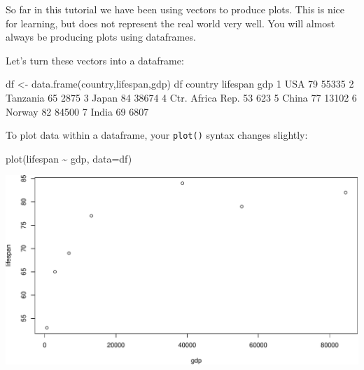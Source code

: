 \documentclass[
]{book}
\newenvironment{Shaded}{\begin{snugshade}}{\end{snugshade}}
\newcommand{\AttributeTok}[1]{\textcolor[rgb]{0.77,0.63,0.00}{#1}}
\newcommand{\DecValTok}[1]{\textcolor[rgb]{0.00,0.00,0.81}{#1}}
\newcommand{\FunctionTok}[1]{\textcolor[rgb]{0.00,0.00,0.00}{#1}}
\newcommand{\NormalTok}[1]{#1}
\newcommand{\OtherTok}[1]{\textcolor[rgb]{0.56,0.35,0.01}{#1}}
\newcommand{\SpecialCharTok}[1]{\textcolor[rgb]{0.00,0.00,0.00}{#1}}
\begin{document}
So far in this tutorial we have been using vectors to produce plots. This is nice for learning, but does not represent the real world very well. You will almost always be producing plots using dataframes.

Let's turn these vectors into a dataframe:

\begin{Shaded}
\begin{Highlighting}[]
\NormalTok{df }\OtherTok{\textless{}{-}} \FunctionTok{data.frame}\NormalTok{(country,lifespan,gdp)}
\NormalTok{df}
\NormalTok{           country lifespan   gdp}
\DecValTok{1}\NormalTok{              USA       }\DecValTok{79} \DecValTok{55335}
\DecValTok{2}\NormalTok{         Tanzania       }\DecValTok{65}  \DecValTok{2875}
\DecValTok{3}\NormalTok{            Japan       }\DecValTok{84} \DecValTok{38674}
\DecValTok{4}\NormalTok{ Ctr. Africa Rep.       }\DecValTok{53}   \DecValTok{623}
\DecValTok{5}\NormalTok{            China       }\DecValTok{77} \DecValTok{13102}
\DecValTok{6}\NormalTok{           Norway       }\DecValTok{82} \DecValTok{84500}
\DecValTok{7}\NormalTok{            India       }\DecValTok{69}  \DecValTok{6807}
\end{Highlighting}
\end{Shaded}

To plot data within a dataframe, your \texttt{plot()} syntax changes slightly:

\begin{Shaded}
\begin{Highlighting}[]
\FunctionTok{plot}\NormalTok{(lifespan }\SpecialCharTok{\textasciitilde{}}\NormalTok{ gdp, }\AttributeTok{data=}\NormalTok{df)}
\end{Highlighting}
\end{Shaded}

\includegraphics{figures/unnamed-chunk-115-1.pdf}
\end{document}
